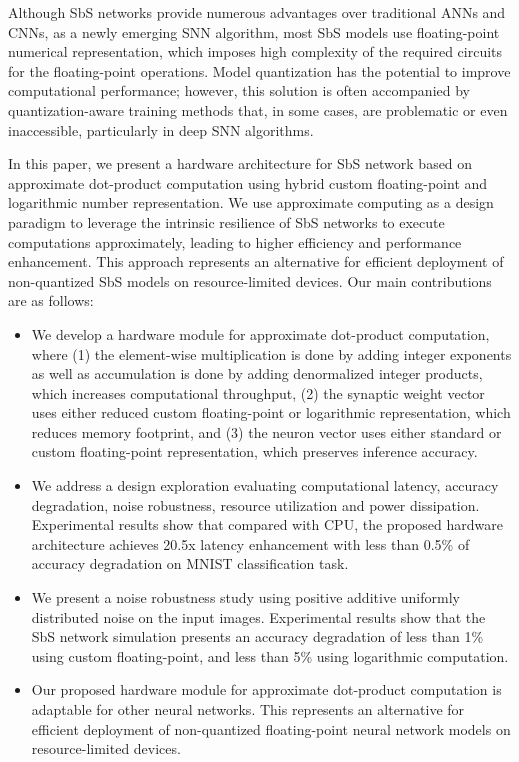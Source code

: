 Although SbS networks provide numerous advantages over traditional ANNs and CNNs, as a newly emerging SNN algorithm, most SbS models use floating-point numerical representation, which imposes high complexity of the required circuits for the floating-point operations. Model quantization has the potential to improve computational performance; however, this solution is often accompanied by quantization-aware training methods that, in some cases, are problematic or even inaccessible, particularly in deep SNN algorithms\cite{zhang2018survey}.

In this paper, we present a hardware architecture for SbS network based on approximate dot-product computation using hybrid custom floating-point and logarithmic number representation. We use approximate computing as a design paradigm to leverage the intrinsic resilience of SbS networks to execute computations approximately, leading to higher efficiency and performance enhancement. This approach represents an alternative for efficient deployment of non-quantized SbS models on resource-limited devices. Our main contributions are as follows:

\begin{itemize}
	\item We develop a hardware module for approximate dot-product computation, where (1) the element-wise multiplication is done by adding integer exponents as well as accumulation is done by adding denormalized integer products, which increases computational throughput, (2) the synaptic weight vector uses either reduced custom floating-point or logarithmic representation, which reduces memory footprint, and (3) the neuron vector uses either standard or custom floating-point representation, which preserves inference accuracy.
	\item We address a design exploration evaluating computational latency, accuracy degradation, noise robustness, resource utilization and power dissipation. Experimental results show that compared with CPU, the proposed hardware architecture achieves 20.5x latency enhancement with less than 0.5\% of accuracy degradation on MNIST classification task.
	\item We present a noise robustness study using positive additive uniformly distributed noise on the input images. Experimental results show that the SbS network simulation presents an accuracy degradation of less than 1\% using custom floating-point, and less than 5\% using logarithmic computation.
	\item Our proposed hardware module for approximate dot-product computation is adaptable for other neural networks. This represents an alternative for efficient deployment of non-quantized floating-point neural network models on resource-limited devices.
\end{itemize}


